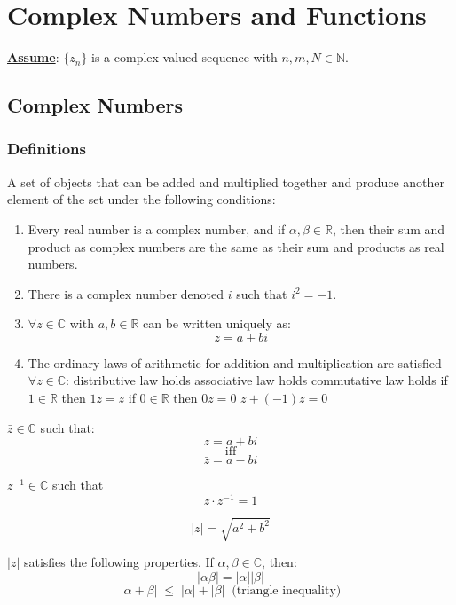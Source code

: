 \chapter{Complex Numbers and Functions}
\underline{\textbf{Assume}}: $\{ {z}_{n} \}$ is a complex valued sequence with $n,m, N \in \mathbb{N}$.
\section{Complex Numbers}
\subsection{Definitions}
\begin{defn}
	A set of objects that can be added and multiplied together and produce another element of the set under the following conditions:
	\begin{enumerate}
		\item Every real number is a complex number, and if $\alpha, \beta \in \mathbb{R}$, then their sum and product as complex numbers are the same as their sum and products as real numbers.
		\item There is a complex number denoted $i$ such that $i^2 = -1$.
		\item $\forall z \in \mathbb{C}$ with $a, b \in \mathbb{R}$ can be written uniquely as: \[z = a + bi\]
		\item The ordinary laws of arithmetic for addition and multiplication are satisfied $\forall z \in \mathbb{C}$:
		\subitem distributive law holds
		\subitem associative law holds
		\subitem commutative law holds
		\subitem if $1 \in \mathbb{R}$ then $1z = z$
		\subitem if $0 \in \mathbb{R}$ then $0z = 0$
		\subitem $z + (-1)z = 0$
	\end{enumerate}
\end{defn}
\begin{defn}
	$\bar{z} \in \mathbb{C}$ such that: 
	\[ z = a + bi\] \[\text{iff}\] \[\bar{z} = a - bi \]
\end{defn}
\begin{defn}
	$z^{-1} \in \mathbb{C}$ such that \[z\cdot z^{-1} = 1\]
\end{defn}
\begin{defn}
	\[|z| = \sqrt{a^2 + b^2}\]
\end{defn}
\begin{thm}
	$|z|$ satisfies the following properties. If $\alpha, \beta \in \mathbb{C}$, then:
	\[|\alpha\beta| = |\alpha||\beta|\]
	\[|\alpha + \beta| \;\leq\; |\alpha| + |\beta| \;\;\text{(triangle inequality)}\]
\end{thm}
